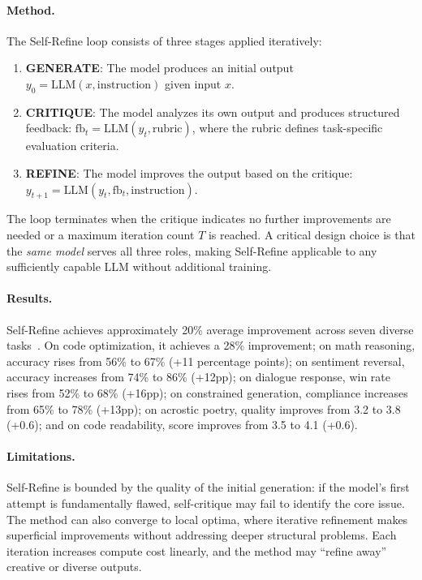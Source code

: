 \paragraph{Method.}
The Self-Refine loop consists of three stages applied iteratively:

\begin{enumerate}
    \item \textbf{GENERATE}: The model produces an initial output $y_0 = \text{LLM}(x, \text{instruction})$ given input $x$.
    \item \textbf{CRITIQUE}: The model analyzes its own output and produces structured feedback: $\text{fb}_t = \text{LLM}(y_t, \text{rubric})$, where the rubric defines task-specific evaluation criteria.
    \item \textbf{REFINE}: The model improves the output based on the critique: $y_{t+1} = \text{LLM}(y_t, \text{fb}_t, \text{instruction})$.
\end{enumerate}

The loop terminates when the critique indicates no further improvements are needed or a maximum iteration count $T$ is reached. A critical design choice is that the \emph{same model} serves all three roles, making Self-Refine applicable to any sufficiently capable LLM without additional training.

\paragraph{Results.}
Self-Refine achieves approximately 20\% average improvement across seven diverse tasks~\citep{madaan2023selfrefine}. On code optimization, it achieves a 28\% improvement; on math reasoning, accuracy rises from 56\% to 67\% (+11 percentage points); on sentiment reversal, accuracy increases from 74\% to 86\% (+12pp); on dialogue response, win rate rises from 52\% to 68\% (+16pp); on constrained generation, compliance increases from 65\% to 78\% (+13pp); on acrostic poetry, quality improves from 3.2 to 3.8 (+0.6); and on code readability, score improves from 3.5 to 4.1 (+0.6).

\paragraph{Limitations.}
Self-Refine is bounded by the quality of the initial generation: if the model's first attempt is fundamentally flawed, self-critique may fail to identify the core issue. The method can also converge to local optima, where iterative refinement makes superficial improvements without addressing deeper structural problems. Each iteration increases compute cost linearly, and the method may ``refine away'' creative or diverse outputs.

